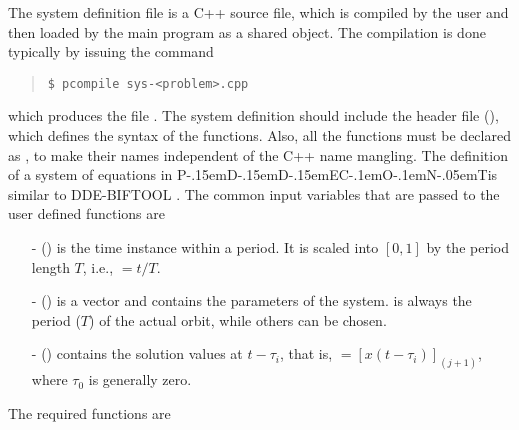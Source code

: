 \documentclass[10pt,a4paper]{ddedoc}
\def\pdde{{P\kern-.15emD\kern-.15emD\kern-.15emE\raisebox{.25ex}{-}C\kern-.1emO\kern-.1emN\kern-.05emT}}
\begin{document}
The system definition file is a C++ source file, which is compiled by the user
and then loaded by the main program  as a shared object. The compilation is
done typically by issuing the command
{ \small \begin{quote} \begin{lstlisting}[basicstyle=\tt,frame=single]
$ pcompile sys-<problem>.cpp
\end{lstlisting} \end{quote} } \noindent
which produces the file .
The system definition should include the header file  (), which defines the syntax of the functions. Also, all the functions must be declared as , to make their names independent of the C++ name mangling. The definition of a system of equations in \pdde is similar to DDE-BIFTOOL \cite{DDEBIF}. The common input variables that are passed to the user defined functions are
\begin{itemize}
  \item[-]  () is the time instance within a period. It is
  scaled into $[ 0, 1 ]$ by the period length $T$, i.e., $ = t/T$.
  \item[-]  () is a vector and contains the parameters of
  the system.  is always the period ($T$) of the actual orbit,
  while others can be chosen.
  \item[-]  () contains the solution values at $t -
  \tau_i$, that is, $= [ x ( t - \tau_i ) ]_{(j+1)}$, where $\tau_0$ is generally zero.
\end{itemize}
The required functions are
\end{document}
